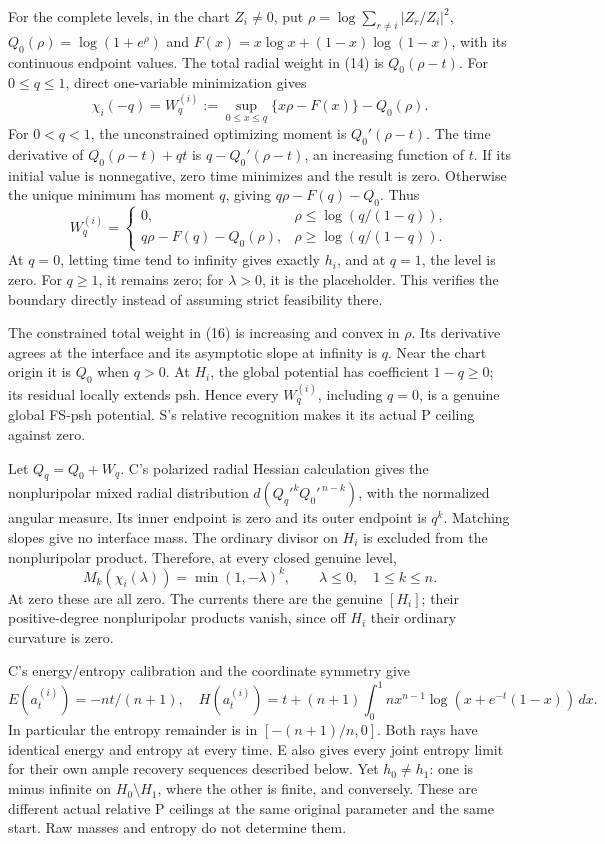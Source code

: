 \documentclass[
  11pt,
]{article}
\begin{document}
For the complete levels, in the chart \(Z_i\ne0\), put
\(\rho=\log\sum_{r\ne i}|Z_r/Z_i|^2\), \(Q_0(\rho)=\log(1+e^\rho)\) and
\(F(x)=x\log x+(1-x)\log(1-x)\), with its continuous endpoint values.
The total radial weight in (14) is \(Q_0(\rho-t)\). For \(0\le q\le1\),
direct one-variable minimization gives \[
\chi_i(-q)=W^{(i)}_q:=
\sup_{0\le x\le q}\{x\rho-F(x)\}-Q_0(\rho).           \tag{16}
\] For \(0<q<1\), the unconstrained optimizing moment is
\(Q_0'(\rho-t)\). The time derivative of \(Q_0(\rho-t)+qt\) is
\(q-Q_0'(\rho-t)\), an increasing function of \(t\). If its initial
value is nonnegative, zero time minimizes and the result is zero.
Otherwise the unique minimum has moment \(q\), giving
\(q\rho-F(q)-Q_0\). Thus \[
W^{(i)}_q=
\begin{cases}
0,&\rho\le\log(q/(1-q)),\\
q\rho-F(q)-Q_0(\rho),&\rho\ge\log(q/(1-q)).
\end{cases}                                               \tag{17}
\] At \(q=0\), letting time tend to infinity gives exactly \(h_i\), and
at \(q=1\), the level is zero. For \(q\ge1\), it remains zero; for
\(\lambda>0\), it is the placeholder. This verifies the boundary
directly instead of assuming strict feasibility there.

The constrained total weight in (16) is increasing and convex in
\(\rho\). Its derivative agrees at the interface and its asymptotic
slope at infinity is \(q\). Near the chart origin it is \(Q_0\) when
\(q>0\). At \(H_i\), the global potential has coefficient \(1-q\ge0\);
its residual locally extends psh. Hence every \(W^{(i)}_q\), including
\(q=0\), is a genuine global FS-psh potential. S's relative recognition
makes it its actual P ceiling against zero.

Let \(Q_q=Q_0+W_q\). C's polarized radial Hessian calculation gives the
nonpluripolar mixed radial distribution \(d(Q_q'^kQ_0'^{\,n-k})\), with
the normalized angular measure. Its inner endpoint is zero and its outer
endpoint is \(q^k\). Matching slopes give no interface mass. The
ordinary divisor on \(H_i\) is excluded from the nonpluripolar product.
Therefore, at every closed genuine level, \[
M_k(\chi_i(\lambda))=\min(1,-\lambda)^k,
\qquad \lambda\le0,\quad 1\le k\le n.                 \tag{18}
\] At zero these are all zero. The currents there are the genuine
\([H_i]\); their positive-degree nonpluripolar products vanish, since
off \(H_i\) their ordinary curvature is zero.

C's energy/entropy calibration and the coordinate symmetry give \[
E(a^{(i)}_t)=-nt/(n+1),\quad
H(a^{(i)}_t)=t+(n+1)\int_0^1nx^{n-1}
            \log(x+e^{-t}(1-x))\,dx.                    \tag{19}
\] In particular the entropy remainder is in \([-(n+1)/n,0]\). Both rays
have identical energy and entropy at every time. E also gives every
joint entropy limit for their own ample recovery sequences described
below. Yet \(h_0\ne h_1\): one is minus infinite on
\(H_0\setminus H_1\), where the other is finite, and conversely. These
are different actual relative P ceilings at the same original parameter
and the same start. Raw masses and entropy do not determine them.
\end{document}
